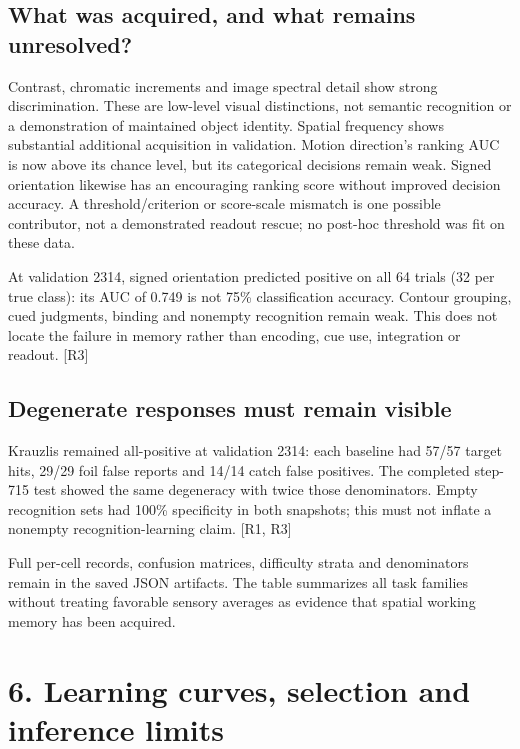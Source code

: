 \documentclass[
  10pt,
]{article}
\newcounter{none} %
\begin{document}
\subsection{What was acquired, and what remains
unresolved?}\label{what-was-acquired-and-what-remains-unresolved}

Contrast, chromatic increments and image spectral detail show strong
discrimination. These are low-level visual distinctions, not semantic
recognition or a demonstration of maintained object identity. Spatial
frequency shows substantial additional acquisition in validation. Motion
direction's ranking AUC is now above its chance level, but its
categorical decisions remain weak. Signed orientation likewise has an
encouraging ranking score without improved decision accuracy. A
threshold/criterion or score-scale mismatch is one possible contributor,
not a demonstrated readout rescue; no post-hoc threshold was fit on
these data.

At validation 2314, signed orientation predicted positive on all 64
trials (32 per true class): its AUC of 0.749 is not 75\% classification
accuracy. Contour grouping, cued judgments, binding and nonempty
recognition remain weak. This does not locate the failure in memory
rather than encoding, cue use, integration or readout. {[}R3{]}

\subsection{Degenerate responses must remain
visible}\label{degenerate-responses-must-remain-visible}

Krauzlis remained all-positive at validation 2314: each baseline had
57/57 target hits, 29/29 foil false reports and 14/14 catch false
positives. The completed step-715 test showed the same degeneracy with
twice those denominators. Empty recognition sets had 100\% specificity
in both snapshots; this must not inflate a nonempty recognition-learning
claim. {[}R1, R3{]}

Full per-cell records, confusion matrices, difficulty strata and
denominators remain in the saved JSON artifacts. The table summarizes
all task families without treating favorable sensory averages as
evidence that spatial working memory has been acquired.

\newpage

\section{6. Learning curves, selection and inference
limits}\label{learning-curves-selection-and-inference-limits}
\end{document}
